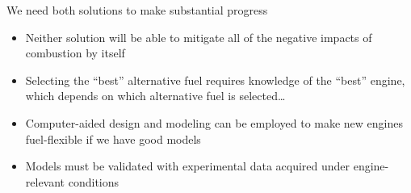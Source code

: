 \documentclass{beamer}
\begin{document}
\begin{frame}{We need both solutions to make substantial progress}
    \begin{itemize}
        \item Neither solution will be able to mitigate all of the negative impacts of combustion by itself
        \item Selecting the “best” alternative fuel requires knowledge of the “best” engine, which depends on which alternative fuel is selected…
        \item Computer-aided design and modeling can be employed to make new engines fuel-flexible \alert{if we have good models}
        \item Models must be validated with experimental data acquired under engine-relevant conditions
    \end{itemize}
\end{frame}
\end{document}
